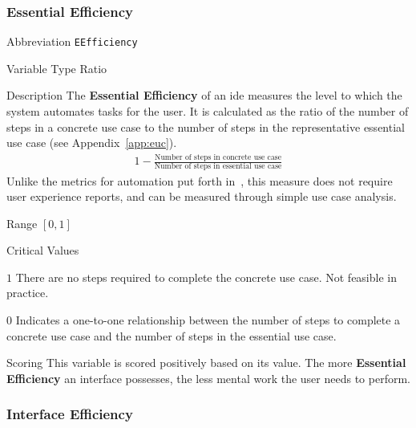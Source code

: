\subsubsection{Essential Efficiency}
\label{subsubsec:eefficiency}

\begin{AlignedDesc}
  \item[Abbreviation] \texttt{EEfficiency}

  \item[Variable Type] Ratio

  \item[Description] The \textbf{Essential Efficiency} of an \ac{ide}
  measures the level to which the system automates tasks for the user. It
  is calculated as the ratio of the number of steps in a concrete use case
  to the number of steps in the representative essential use case (see
  Appendix~\ref{app:euc}).~\cite{constantine1996}
%
  \begin{align*}
    1 - \frac{\text{Number of steps in concrete use case}}
             {\text{Number of steps in essential use case}}
  \end{align*}
%
  Unlike the metrics for automation put forth in~\cite{Wei1998}, this
  measure does not require user experience reports, and can be measured
  through simple use case analysis.

  \item[Range] $[0, 1]$

  \item[Critical Values]
  \begin{AlignedDesc}
    \item[$1$] There are no steps required to complete the concrete use
    case. Not feasible in practice.
    \item[$0$] Indicates a one-to-one relationship between the number of
    steps to complete a concrete use case and the number of steps in the
    essential use case.
  \end{AlignedDesc}

  \item[Scoring] This variable is scored positively based on its value. The
  more \textbf{Essential Efficiency} an interface possesses, the less
  mental work the user needs to perform.

\end{AlignedDesc}

\subsubsection{Interface Efficiency}
\label{subsubsec:iefficiency}

